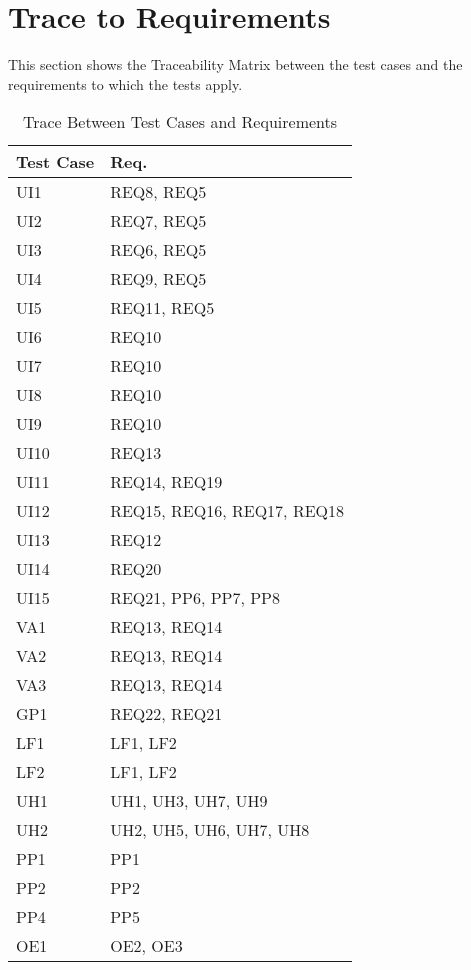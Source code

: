 \documentclass[12pt, titlepage]{article}
\begin{document}
\section{Trace to Requirements}
This section shows the Traceability Matrix between the test cases and the requirements to which the tests apply.
\begin{table}[H]
\centering
\begin{tabular}{p{} p{}}
\toprule
\textbf{Test Case} & \textbf{Req.}\\
\midrule
UI1 & REQ8, REQ5\\
UI2 & REQ7, REQ5\\
UI3 & REQ6, REQ5\\
UI4 & REQ9, REQ5\\
UI5 & REQ11, REQ5\\
UI6 & REQ10 \\
UI7 & REQ10 \\
UI8 & REQ10 \\
UI9 & REQ10 \\
UI10 & REQ13 \\
UI11 & REQ14, REQ19 \\
UI12 & REQ15, REQ16, REQ17, REQ18 \\
UI13 & REQ12 \\
UI14 & REQ20 \\
UI15 & REQ21, PP6, PP7, PP8 \\
VA1 & REQ13, REQ14 \\
VA2 & REQ13, REQ14 \\
VA3 & REQ13, REQ14 \\
GP1 & REQ22, REQ21 \\
LF1 & LF1, LF2 \\
LF2 & LF1, LF2 \\
UH1 & UH1, UH3, UH7, UH9 \\
UH2 & UH2, UH5, UH6, UH7, UH8 \\
PP1 & PP1 \\
PP2 & PP2 \\
PP4 & PP5 \\
OE1 & OE2, OE3 \\
\bottomrule
\end{tabular}
\caption{Trace Between Test Cases and Requirements}
\label{TblRT}
\end{table}

\newpage
\end{document}

